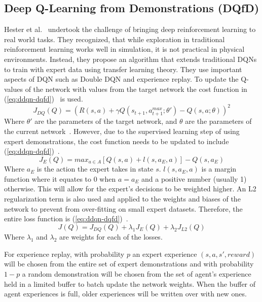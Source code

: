 \documentclass[12pt,american]{report}
\begin{document}
\subsection{Deep Q-Learning from Demonstrations (DQfD)}
Hester et al.~\cite{hester2017learning} undertook the challenge of bringing deep reinforcement learning to real world tasks.  They recognized, that while exploration in traditional reinforcement learning works well in simulation, it is not practical in physical environments.  Instead, they propose an algorithm that extends traditional DQNs to train with expert data using transfer learning theory.  They use important aspects of DQN such as Double DQN and experience replay.  To update the Q-values of the network with values from the target network the cost function in (\ref{eq:ddqn-dqfd})~\cite{hester2017learning} is used.
\begin{equation}
     \label{eq:ddqn-dqfd}
     J_{DQ}(Q) =(R(s,a)+\gamma Q(s_{t+1},a^{max}_{t+1};\theta')-Q(s,a;\theta))^2%
\end{equation}
Where $\theta'$ are the parameters of the target network, and $\theta$ are the parameters of the current network~\cite{van2016deep}.  However, due to the supervised learning step of using expert demonstrations, the cost function needs to be updated to include (\ref{eq:ddqn-dqfd})~\cite{hester2017learning}.
\begin{equation}
     \label{eq:ddqn-dqfd}
     J_{E}(Q) =max_{a\in A}[Q(s,a)+l(s,a_E,a)]-Q(s,a_E)%
\end{equation}
Where $a_E$ is the action the expert takes in state $s$.  $l(s,a_E,a)$ is a margin function where it equates to 0 when $a=a_E$ and a positive number (usually 1) otherwise.  This will allow for the expert's decisions to be weighted higher.  An L2 regularization term is also used and applied to the weights and biases of the network to prevent from over-fitting on small expert datasets.  Therefore, the entire loss function is (\ref{eq:ddqn-dqfd})~\cite{hester2017learning}.
\begin{equation}
     \label{eq:ddqn-dqfd}
     J(Q) =J_{DQ}(Q) + \lambda_1J_E(Q) + \lambda_2J_{L2}(Q)%
\end{equation}
Where $\lambda_1$ and $\lambda_2$ are weights for each of the losses. 

For experience replay, with probability $p$ an expert experience $(s,a,s',reward)$ will be chosen from the entire set of expert demonstrations and with probability $1-p$ a random demonstration will be chosen from the set of agent's experience held in a limited buffer to batch update the network weights.  When the buffer of agent experiences is full, older experiences will be written over with new ones.  
\end{document}
